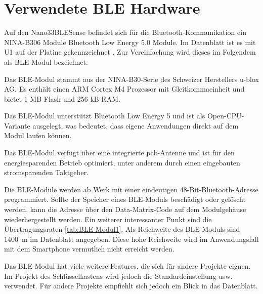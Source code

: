 \section{Verwendete BLE Hardware}
Auf den Nano33BLESense befindet sich für die Bluetooth-Kommunikation ein NINA-B306 Module Bluetooth Low Energy 5.0 Module. Im Datenblatt ist es mit U1 auf der Platine gekennzeichnet \cite{Arduino2025c}. Zur Vereinfachung wird dieses im Folgendem als BLE-Modul bezeichnet.

Das  BLE-Modul stammt aus der NINA-B30-Serie des Schweizer Herstellers u-blox AG.
Es enthält einen ARM Cortex M4 Prozessor mit Gleitkommaeinheit und bietet 1 MB Flash und 256 kB RAM.
\cite{Ublox:2023}


Das BLE-Modul unterstützt Bluetooth Low Energy 5 und ist als Open-CPU-Variante ausgelegt, was bedeutet, dass eigene Anwendungen direkt auf dem Modul laufen können.

Das BLE-Modul verfügt über eine integrierte \ac{pcb}-Antenne und ist für den energiesparenden Betrieb optimiert, unter anderem durch einen eingebauten stromsparenden Taktgeber.
\cite{Ublox:2023}


Die BLE-Module werden ab Werk mit einer eindeutigen 48-Bit-Bluetooth-Adresse programmiert. Sollte der Speicher eines BLE-Moduls beschädigt oder gelöscht werden, kann die Adresse über den Data-Matrix-Code auf dem Modulgehäuse wiederhergestellt werden.
Ein weiterer interessanter Punkt sind die Übertragungsraten \ref{tab:BLE-Modul1}. Als Reichweite des BLE-Moduls sind 1400~m im Datenblatt angegeben. Diese hohe Reichweite wird im Anwendungsfall mit dem Smartphone vermutlich nicht erreicht werden. 
\cite{Ublox:2023}



Das BLE-Modul hat viele weitere Features, die sich für andere Projekte eignen. Im Projekt des Schlüsselkastens wird jedoch die Standardeinstellung usw. verwendet. Für andere Projekte empfiehlt sich jedoch ein Blick in das Datenblatt. 
\cite{Ublox:2023}

